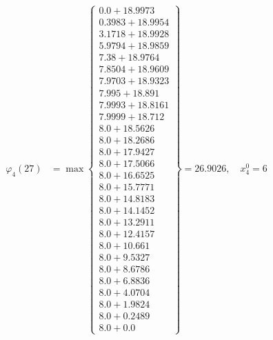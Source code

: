 \documentclass{article}
\begin{document}
\begin{align*}
  
\varphi_{4}(27) &= \max \left\{ \begin{array}{c}
0.0 + 18.9973 \\
 0.3983 + 18.9954 \\
 3.1718 + 18.9928 \\
 5.9794 + 18.9859 \\
 7.38 + 18.9764 \\
 7.8504 + 18.9609 \\
 7.9703 + 18.9323 \\
 7.995 + 18.891 \\
 7.9993 + 18.8161 \\
 7.9999 + 18.712 \\
 8.0 + 18.5626 \\
 8.0 + 18.2686 \\
 8.0 + 17.9427 \\
 8.0 + 17.5066 \\
 8.0 + 16.6525 \\
 8.0 + 15.7771 \\
 8.0 + 14.8183 \\
 8.0 + 14.1452 \\
 8.0 + 13.2911 \\
 8.0 + 12.4157 \\
 8.0 + 10.661 \\
 8.0 + 9.5327 \\
 8.0 + 8.6786 \\
 8.0 + 6.8836 \\
 8.0 + 4.0704 \\
 8.0 + 1.9824 \\
 8.0 + 0.2489 \\
 8.0 + 0.0
\end{array} \right\}=26.9026,\quad x_{4}^0=6\\
  
  
  

\end{align*}
\end{document}
